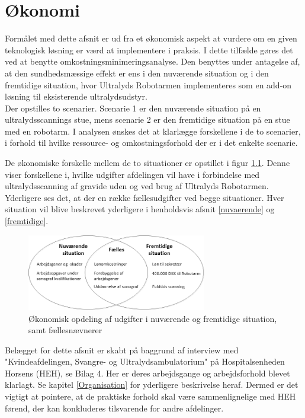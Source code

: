 \chapter{Økonomi} \label{Okonomi}
Formålet med dette afsnit er ud fra et økonomisk aspekt at vurdere om en given teknologisk løsning er værd at implementere i praksis. I dette tilfælde gøres det ved at benytte omkostningsminimeringsanalyse. Den benyttes under antagelse af, at den sundhedsmæssige effekt er ens i den nuværende situation og i den fremtidige situation, hvor Ultralyds Robotarmen implementeres som en add-on løsning til eksisterende ultralydsudstyr. \\
Der opstilles to scenarier. Scenarie 1 er den nuværende situation på en ultralydsscannings stue, mens scenarie 2 er den fremtidige situation på en stue med en robotarm. I analysen ønskes det at klarlægge forskellene i de to scenarier, i forhold til hvilke ressource- og omkostningsforhold der er i det enkelte scenarie. 

De økonomiske forskelle mellem de to situationer er opstillet i figur \ref{ModelOkonomi}. Denne viser forskellene i, hvilke udgifter afdelingen vil have i forbindelse med ultralydsscanning af gravide uden og ved brug af Ultralyds Robotarmen. Yderligere ses det, at der en række fællesudgifter ved begge situationer. Hver situation vil blive beskrevet yderligere i henholdsvis afsnit \ref{nuvaerende} og \ref{fremtidige}. 

\begin{figure}[H]\centering
	\includegraphics[width = 0.7\textwidth]{Figurer/ModelOkonomi}
	\caption{Økonomisk opdeling af udgifter i nuværende og fremtidige situation, samt fællesnævnerer}
	\label{ModelOkonomi}
\end{figure}

Belægget for dette afsnit er skabt på baggrund af interview med "Kvindeafdelingen, Svangre- og Ultralydsambulatorium" på Hospitalsenheden Horsens (HEH), se Bilag 4. Her er deres arbejdsgange og arbejdsforhold blevet klarlagt. Se kapitel \ref{Organisation} for yderligere beskrivelse heraf. Dermed er det vigtigt at pointere, at de praktiske forhold skal være sammenlignelige med HEH førend, der kan konkluderes tilsvarende for andre afdelinger.

